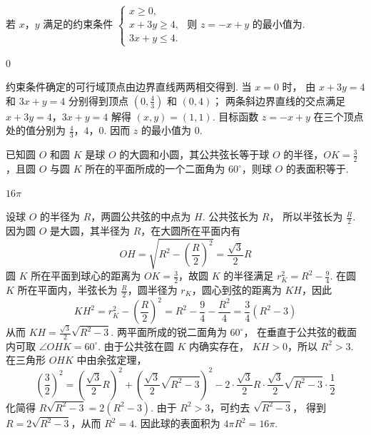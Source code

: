 \begin{problem}
若 \(x\)，\(y\) 满足的约束条件 \(\begin{cases}
x\geqslant 0,\\
x + 3y\geqslant 4,\\
3x + y\leqslant 4.
\end{cases}\) 则 \(z = -x + y\) 的最小值为\fillinblank{}.

\begin{answer}
0
\end{answer}

\begin{solution}
约束条件确定的可行域顶点由边界直线两两相交得到. 当 \(x=0\) 时，
由 \(x+3y=4\) 和 \(3x+y=4\) 分别得到顶点 \(\left(0,\frac{4}{3}\right)\) 和 \((0,4)\)；
两条斜边界直线的交点满足
\(x+3y=4\)，\(3x+y=4\)
解得 \((x,y)=(1,1)\). 目标函数 \(z=-x+y\) 在三个顶点处的值分别为
\(\frac{4}{3}\)，\(4\)，\(0\). 因而 \(z\) 的最小值为 \(0\).
\end{solution}
\end{problem}

\begin{problem}
已知圆 \(O\) 和圆 \(K\) 是球 \(O\) 的大圆和小圆，其公共弦长等于球 \(O\) 的半径，\(OK = \frac{3}{2}\)，且圆 \(O\) 与圆 \(K\) 所在的平面所成的一个二面角为 \(60^{\circ}\)，则球 \(O\) 的表面积等于\fillinblank{}.

\begin{answer}
\(16\pi\)
\end{answer}

\begin{solution}
设球 \(O\) 的半径为 \(R\)，两圆公共弦的中点为 \(H\). 公共弦长为 \(R\)，
所以半弦长为 \(\frac{R}{2}\). 因为圆 \(O\) 是大圆，其半径为 \(R\)，在大圆所在平面内有
\[
OH=\sqrt{R^2-\left(\frac{R}{2}\right)^2}=\frac{\sqrt{3}}{2}R
\]
圆 \(K\) 所在平面到球心的距离为 \(OK=\frac{3}{2}\)，故圆 \(K\) 的半径满足
\(r_K^2=R^2-\frac{9}{4}\). 在圆 \(K\) 所在平面内，半弦长为 \(\frac{R}{2}\)，圆半径为 \(r_K\)，圆心到弦的距离为 \(KH\)，因此
\[
KH^2=r_K^2-\left(\frac{R}{2}\right)^2
=R^2-\frac{9}{4}-\frac{R^2}{4}
=\frac{3}{4}(R^2-3)
\]
从而 \(KH=\frac{\sqrt{3}}{2}\sqrt{R^2-3}\). 两平面所成的锐二面角为 \(60^{\circ}\)，
在垂直于公共弦的截面内可取 \(\angle OHK=60^{\circ}\). 由于公共弦在圆 \(K\) 内确实存在，
\(KH>0\)，所以 \(R^2>3\). 在三角形 \(OHK\) 中由余弦定理，
\[
\left(\frac{3}{2}\right)^2
=\left(\frac{\sqrt{3}}{2}R\right)^2
+\left(\frac{\sqrt{3}}{2}\sqrt{R^2-3}\right)^2
-2\cdot\frac{\sqrt{3}}{2}R\cdot\frac{\sqrt{3}}{2}\sqrt{R^2-3}\cdot\frac{1}{2}
\]
化简得 \(R\sqrt{R^2-3}=2(R^2-3)\). 由于 \(R^2>3\)，可约去 \(\sqrt{R^2-3}\)，
得到 \(R=2\sqrt{R^2-3}\)，从而 \(R^2=4\). 因此球的表面积为
\(4\pi R^2=16\pi\).
\end{solution}
\end{problem}

